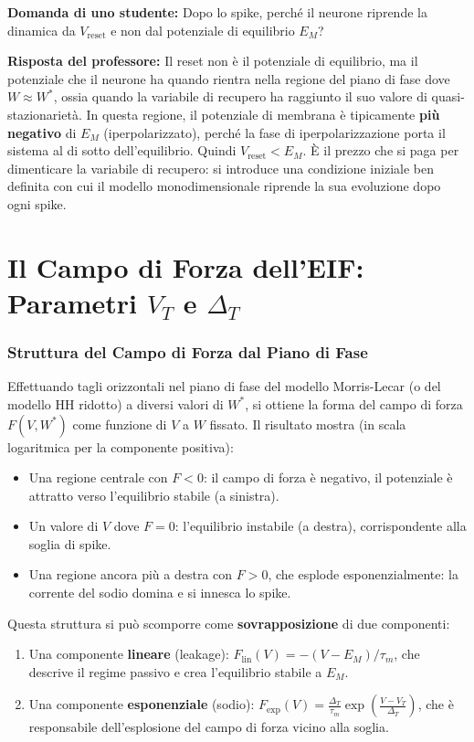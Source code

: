 \begin{tcolorbox}[colback=gray!5, colframe=gray!40, arc=2mm, boxrule=0.5pt]
\textbf{Domanda di uno studente:} Dopo lo spike, perché il neurone riprende la dinamica da $V_{\text{reset}}$ e non dal potenziale di equilibrio $E_M$?

\textbf{Risposta del professore:} Il reset non è il potenziale di equilibrio, ma il potenziale che il neurone ha quando rientra nella regione del piano di fase dove $W \approx W^*$, ossia quando la variabile di recupero ha raggiunto il suo valore di quasi-stazionarietà. In questa regione, il potenziale di membrana è tipicamente \textbf{più negativo} di $E_M$ (iperpolarizzato), perché la fase di iperpolarizzazione porta il sistema al di sotto dell'equilibrio. Quindi $V_{\text{reset}} < E_M$. È il prezzo che si paga per dimenticare la variabile di recupero: si introduce una condizione iniziale ben definita con cui il modello monodimensionale riprende la sua evoluzione dopo ogni spike.
\end{tcolorbox}

\section{Il Campo di Forza dell'EIF: Parametri $V_T$ e $\Delta_T$}

\subsubsection{Struttura del Campo di Forza dal Piano di Fase}

Effettuando tagli orizzontali nel piano di fase del modello Morris-Lecar (o del modello HH ridotto) a diversi valori di $W^*$, si ottiene la forma del campo di forza $F(V, W^*)$ come funzione di $V$ a $W$ fissato. Il risultato mostra (in scala logaritmica per la componente positiva):
\begin{itemize}
    \item Una regione centrale con $F < 0$: il campo di forza è negativo, il potenziale è attratto verso l'equilibrio stabile (a sinistra).
    \item Un valore di $V$ dove $F = 0$: l'equilibrio instabile (a destra), corrispondente alla soglia di spike.
    \item Una regione ancora più a destra con $F > 0$, che esplode esponenzialmente: la corrente del sodio domina e si innesca lo spike.
\end{itemize}

Questa struttura si può scomporre come \textbf{sovrapposizione} di due componenti:
\begin{enumerate}
    \item Una componente \textbf{lineare} (leakage): $F_{\text{lin}}(V) = -(V - E_M)/\tau_m$, che descrive il regime passivo e crea l'equilibrio stabile a $E_M$.
    \item Una componente \textbf{esponenziale} (sodio): $F_{\text{exp}}(V) = \frac{\Delta_T}{\tau_m} \exp\!\left(\frac{V - V_T}{\Delta_T}\right)$, che è responsabile dell'esplosione del campo di forza vicino alla soglia.
\end{enumerate}

